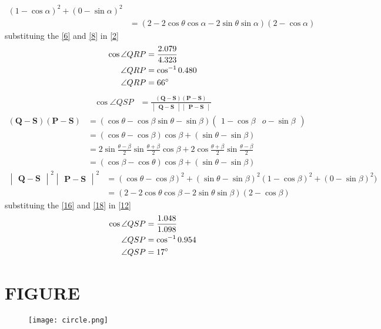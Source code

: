 \documentclass[12pt]{article}
\newcommand{\mydet}[1]{\ensuremath{\begin{vmatrix}#1\end{vmatrix}}}
\providecommand{\brak}[1]{\ensuremath{\left(#1\right)}}
\newcommand{\myvec}[1]{\ensuremath{\begin{pmatrix}#1\end{pmatrix}}}
\let\vec\mathbf
\begin{document}
\begin{enumerate}
\begin{align}
	\brak{1-\cos\alpha}^2+\brak{0-\sin\alpha}^2\\
	&=\brak{2-2\cos\theta\cos\alpha-2\sin\theta\sin\alpha}\brak{2-\cos\alpha}\label{8}
\end{align}
substituing the \eqref{6} and \eqref{8} in \eqref{2}
\begin{align}
\cos\angle QRP&=\frac{2.079}{4.323}\\
\angle QRP&=\cos^{-1}0.480\\
\angle QRP&=66\degree
\end{align}
\begin{align}
\cos\angle QSP&= \frac{\brak{\vec{Q}-\vec{S}}\brak{\vec{P}-\vec{S}}}{\mydet{\vec{Q}-\vec{S}}\mydet{\vec{P}-\vec{S}}}\label{12}
\end{align}
\begin{align}
\brak{\vec{Q}-\vec{S}}\brak{\vec{P}-\vec{S}}&= \brak{\cos\theta-\cos\beta \sin\theta-\sin\beta}\myvec{1-\cos\beta &o-\sin\beta}\\
&=\brak{\cos\theta-\cos\beta}\cos\beta+\brak{\sin\theta-\sin\beta}\\
&=2\sin\frac{\theta-\beta}{2}\sin\frac{\theta+\beta}{2}\cos\beta+2\cos\frac{\theta+\beta}{2}\sin\frac{\theta-\beta}{2}\\
&=\brak{\cos\beta-\cos\theta}\cos\beta+\brak{\sin\theta-\sin\beta}\label{16}
\end{align}
\begin{align}
\mydet{\vec{Q}-\vec{S}}^2\mydet{\vec{P}-\vec{S}}^2 &= \brak{\cos\theta-\cos\beta}^2+\brak{\sin\theta-\sin\beta}^2
	\brak{1-\cos\beta}^2+\brak{0-\sin\beta}^2)\\
	&=\brak{2-2\cos\theta\cos\beta-2\sin\theta\sin\beta}\brak{2-\cos\beta}\label{18}
\end{align}
substituing the \eqref{16} and \eqref{18} in \eqref{12}
\begin{align}
\cos\angle QSP&=\frac{1.048}{1.098}\\
\angle QSP&=\cos^{-1}0.954\\
\angle QSP&=17\degree
\end{align}
\section{FIGURE}
\begin{figure}[h]
\centering
\texttt{[image: circle.png]}
\caption{}
		\label{fig:Figure}
\end{figure}
\end{enumerate}
\end{document}
